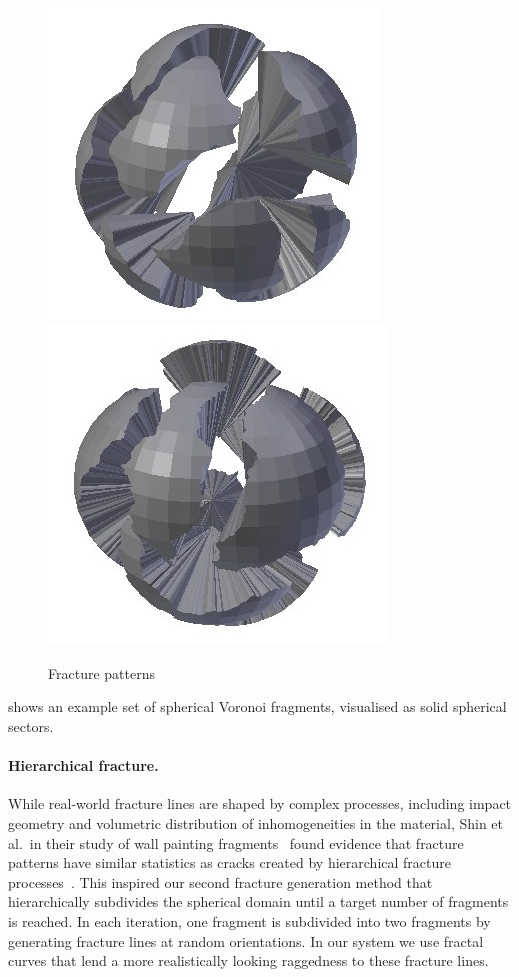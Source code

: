 \documentclass[acmlarge,screen,dvipsnames]{acmart}
\begin{document}
\begin{figure}[htb]
  \hspace{0.2in}\\
  \strut\hfill%
  {\includegraphics[width=0.30\linewidth]{images/fracturehighamplitude}}%
  \hspace{0.2in}%
  {\includegraphics[width=0.30\linewidth]{images/fracturehighestamplitude}}%
  \hspace*{0.1in}%
  \caption{\label{fig:fracture-type-examples}%
    Fracture patterns}
\end{figure}
%
shows an example set
of spherical Voronoi fragments, visualised as solid spherical sectors.

\paragraph{Hierarchical fracture.}
%
While real-world fracture lines are shaped by complex processes,
including impact geometry and volumetric distribution of
inhomogeneities in the material, Shin et al.\ in their study of wall
painting fragments~\cite{Shin:2012:ASF:2362402.2362404} found evidence
that fracture patterns have similar statistics as cracks created by
hierarchical fracture processes~\cite{Bohn:2005:Four}.
%
This inspired our second fracture generation method that
hierarchically subdivides the spherical domain until a target number
of fragments is reached. In each iteration, one fragment is subdivided
into two fragments by generating fracture lines at random
orientations.
%
In our system we use fractal curves that lend a more realistically
looking raggedness to these fracture lines.
\end{document}
